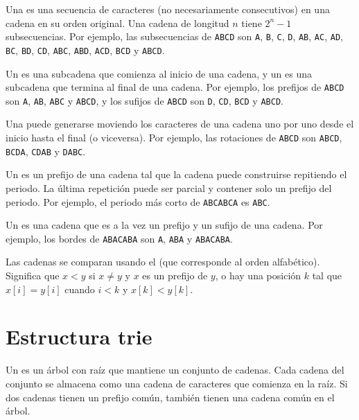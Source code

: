 
Una  es una secuencia de
caracteres (no necesariamente consecutivos)
en una cadena en su orden original.
Una cadena de longitud $n$ tiene $2^n-1$ subsecuencias.
Por ejemplo, las subsecuencias de
\texttt{ABCD} son
\texttt{A}, \texttt{B}, \texttt{C}, \texttt{D},
\texttt{AB}, \texttt{AC}, \texttt{AD},
\texttt{BC}, \texttt{BD}, \texttt{CD},
\texttt{ABC}, \texttt{ABD}, \texttt{ACD},
\texttt{BCD} y \texttt{ABCD}.


Un  es una subcadena que comienza al inicio
de una cadena,
y un  es una subcadena que termina al final
de una cadena.
Por ejemplo,
los prefijos de \texttt{ABCD} son
\texttt{A}, \texttt{AB}, \texttt{ABC} y \texttt{ABCD},
y los sufijos de \texttt{ABCD} son
\texttt{D}, \texttt{CD}, \texttt{BCD} y \texttt{ABCD}.


Una  puede generarse moviendo
los caracteres de una cadena uno por uno desde el inicio
hasta el final (o viceversa).
Por ejemplo, las rotaciones de \texttt{ABCD} son
\texttt{ABCD}, \texttt{BCDA}, \texttt{CDAB} y \texttt{DABC}.


Un  es un prefijo de una cadena tal que
la cadena puede construirse repitiendo el periodo.
La última repetición puede ser parcial y contener
solo un prefijo del periodo.
Por ejemplo, el periodo más corto de
\texttt{ABCABCA} es \texttt{ABC}.


Un  es una cadena que es a la vez
un prefijo y un sufijo de una cadena.
Por ejemplo, los bordes de \texttt{ABACABA}
son \texttt{A}, \texttt{ABA} y \texttt{ABACABA}.


Las cadenas se comparan usando el 
(que corresponde al orden alfabético).
Significa que $x<y$ si $x \neq y$ y $x$ es un prefijo de $y$,
o hay una posición $k$ tal que
$x[i]=y[i]$ cuando $i<k$ y $x[k]<y[k]$.

\section{Estructura trie}


Un  es un árbol con raíz que
mantiene un conjunto de cadenas.
Cada cadena del conjunto se almacena como
una cadena de caracteres que comienza en la raíz.
Si dos cadenas tienen un prefijo común,
también tienen una cadena común en el árbol.

